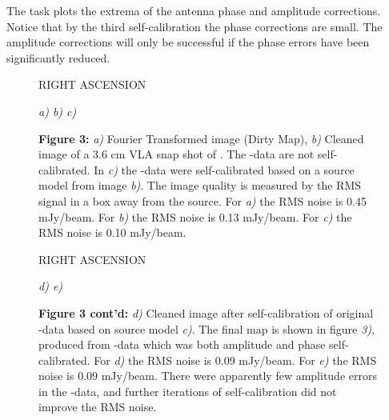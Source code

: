 The task  plots the extrema of the antenna
phase and amplitude corrections.  Notice that by
the third self-calibration the phase corrections are small.
The amplitude corrections will only be successful if the
phase errors have been significantly reduced.

%
\clearpage

%
\clearpage

\begin{figure}[t]
\vskip 3in

{\hfill RIGHT ASCENSION \hfill }

{\it \hskip 1in a) \hfill b) \hfill c) \hskip 1in}

{\bf Figure 3:}
{\it a)} Fourier Transformed image (Dirty Map), {\it b)} Cleaned image
of a 3.6 cm VLA snap shot of \MG.
The \UV-data are not self-calibrated.
In {\it c)} the \UV-data were self-calibrated based on a
source model from image {\it b)}.
The image quality is measured
by the RMS signal in a box away from the source.
For {\it a)} the RMS noise is 0.45 mJy/beam.
For {\it b)} the RMS noise is 0.13 mJy/beam.
For {\it c)} the RMS noise is 0.10 mJy/beam.
\end{figure}


\tablestyle
\begin{figure}[t]
\vskip 3in

{\hfill RIGHT ASCENSION \hfill }

{\it \hskip 1.5in d) \hfill e) \hskip 1.5in}

{\bf Figure 3 cont'd:}
{\it d)} Cleaned image after self-calibration of original \UV-data
based on source model {\it c)}.
The final map is shown in figure {\it 3)}, produced from \UV-data
which was both amplitude and phase self-calibrated.
For {\it d)} the RMS noise is 0.09 mJy/beam.
For {\it e)} the RMS noise is 0.09 mJy/beam.
There were apparently few amplitude errors in the \UV-data,
and further iterations of self-calibration did not
improve the RMS noise.
\end{figure}

\clearpage

%


